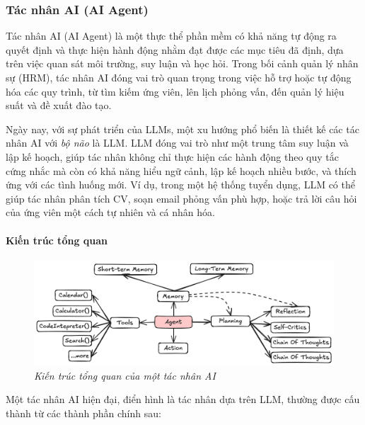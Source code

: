 \documentclass{article}
\begin{document}
\subsubsection{Tác nhân AI (AI Agent)}

Tác nhân AI (AI Agent) là một thực thể phần mềm có khả năng tự động ra quyết định và thực hiện hành động nhằm đạt được các mục tiêu đã định, dựa trên việc quan sát môi trường, suy luận và học hỏi. Trong bối cảnh quản lý nhân sự (HRM), tác nhân AI đóng vai trò quan trọng trong việc hỗ trợ hoặc tự động hóa các quy trình, từ tìm kiếm ứng viên, lên lịch phỏng vấn, đến quản lý hiệu suất và đề xuất đào tạo.

Ngày nay, với sự phát triển của LLMs, một xu hướng phổ biến là thiết kế các tác nhân AI với \textit{bộ não} là LLM. LLM đóng vai trò như một trung tâm suy luận và lập kế hoạch, giúp tác nhân không chỉ thực hiện các hành động theo quy tắc cứng nhắc mà còn có khả năng hiểu ngữ cảnh, lập kế hoạch nhiều bước, và thích ứng với các tình huống mới. Ví dụ, trong một hệ thống tuyển dụng, LLM có thể giúp tác nhân phân tích CV, soạn email phỏng vấn phù hợp, hoặc trả lời câu hỏi của ứng viên một cách tự nhiên và cá nhân hóa.

\paragraph{Kiến trúc tổng quan}
\begin{figure}[H]
    \centering
    \includegraphics[width=1\linewidth]{img/ai-agent-architecture.png}
    \caption{\centering\textit{Kiến trúc tổng quan của một tác nhân AI}}
    \label{fig:2.1.5}
\end{figure}
Một tác nhân AI hiện đại, điển hình là tác nhân dựa trên LLM, thường được cấu thành từ các thành phần chính sau:
\end{document}
